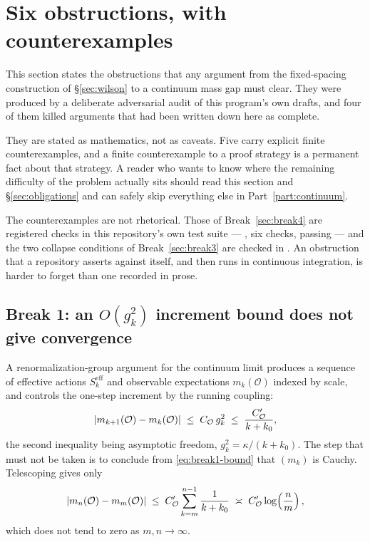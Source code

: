 \section{Six obstructions, with counterexamples}
\label{sec:breaks}

This section states the obstructions that any argument from the
fixed-spacing construction of \S\ref{sec:wilson} to a continuum mass gap
must clear. They were produced by a deliberate adversarial audit of this
program's own drafts, and four of them killed arguments that had been
written down here as complete.

They are stated as mathematics, not as caveats. Five carry explicit
finite counterexamples, and a finite counterexample to a proof strategy
is a permanent fact about that strategy. A reader who wants to know
where the remaining difficulty of the problem actually sits should read
this section and \S\ref{sec:obligations} and can safely skip everything
else in Part~\ref{part:continuum}.

The counterexamples are not rhetorical. Those of
Break~\ref{sec:break4} are registered checks in this repository's own
test suite --- , six checks,
passing --- and the two collapse conditions of Break~\ref{sec:break3}
are checked in . An
obstruction that a repository asserts against itself, and then runs in
continuous integration, is harder to forget than one recorded in prose.

\subsection{Break 1: an \texorpdfstring{$O(g_k^2)$}{O(g\_k\textasciicircum 2)} increment bound does not give convergence}
\label{sec:break1}

A renormalization-group argument for the continuum limit produces a
sequence of effective actions $S_k^{\mathrm{eff}}$ and observable
expectations $m_k(\mathcal{O})$ indexed by scale, and controls the
one-step increment by the running coupling:
\begin{equation}
  \left\lvert m_{k+1}(\mathcal{O}) - m_k(\mathcal{O}) \right\rvert
  \;\le\; C_{\mathcal{O}}\, g_k^2
  \;\le\; \frac{C_{\mathcal{O}}'}{k + k_0},
  \label{eq:break1-bound}
\end{equation}
the second inequality being asymptotic freedom, $g_k^2 = \kappa/(k+k_0)$.
The step that must not be taken is to conclude from
\eqref{eq:break1-bound} that $(m_k)$ is Cauchy. Telescoping gives only
\begin{equation}
  \left\lvert m_n(\mathcal{O}) - m_m(\mathcal{O}) \right\rvert
  \;\le\; C_{\mathcal{O}}' \sum_{k=m}^{n-1} \frac{1}{k+k_0}
  \;\asymp\; C_{\mathcal{O}}' \log\!\left(\frac{n}{m}\right),
\end{equation}
which does not tend to zero as $m, n \to \infty$.

